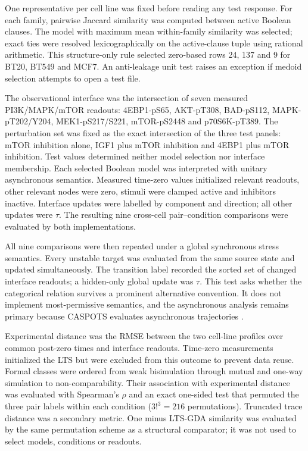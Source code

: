 \documentclass[pdflatex,sn-mathphys-ay]{sn-jnl}
\theoremstyle{definition}
\newcommand{\TAU}{\tau}
\begin{document}
One representative per cell line was fixed before reading any test response.
For each family, pairwise Jaccard similarity was computed between active Boolean
clauses. The model with maximum mean within-family similarity was selected; exact
ties were resolved lexicographically on the active-clause tuple using rational
arithmetic. This structure-only rule selected zero-based rows 24, 137 and 9 for
BT20, BT549 and MCF7. An anti-leakage unit test raises an exception if medoid
selection attempts to open a test file.

The observational interface was the intersection of seven measured
PI3K/MAPK/mTOR readouts: 4EBP1-pS65, AKT-pT308, BAD-pS112, MAPK-pT202/Y204,
MEK1-pS217/S221, mTOR-pS2448 and p70S6K-pT389. The perturbation set was fixed as
the exact intersection of the three test panels: mTOR inhibition alone,
IGF1 plus mTOR inhibition and 4EBP1 plus mTOR inhibition. Test values determined
neither model selection nor interface membership. Each selected Boolean model
was interpreted with unitary asynchronous semantics. Measured time-zero values
initialized relevant readouts, other relevant nodes were zero, stimuli were
clamped active and inhibitors inactive. Interface updates were labelled by
component and direction; all other updates were $\TAU$. The resulting nine
cross-cell pair--condition comparisons were evaluated by both implementations.

All nine comparisons were then repeated under a global synchronous stress
semantics. Every unstable target was evaluated from the same source state and
updated simultaneously. The transition label recorded the sorted set of changed
interface readouts; a hidden-only global update was $\TAU$. This test asks whether
the categorical relation survives a prominent alternative convention. It does
not implement most-permissive semantics, and the asynchronous analysis remains
primary because CASPOTS evaluates asynchronous trajectories \citep{Pauleve2020,
Razzaq2018}.

Experimental distance was the RMSE between the two cell-line profiles over
common post-zero times and interface readouts. Time-zero measurements initialized
the LTS but were excluded from this outcome to prevent data reuse. Formal classes were ordered from weak
bisimulation through mutual and one-way simulation to non-comparability. Their
association with experimental distance was evaluated with Spearman's $\rho$ and
an exact one-sided test that permuted the three pair labels within each condition
($3!^3=216$ permutations). Truncated trace distance was a secondary metric.
One minus LTS-GDA similarity was evaluated by the same permutation scheme as a
structural comparator; it was not used to select models, conditions or readouts.
\end{document}
